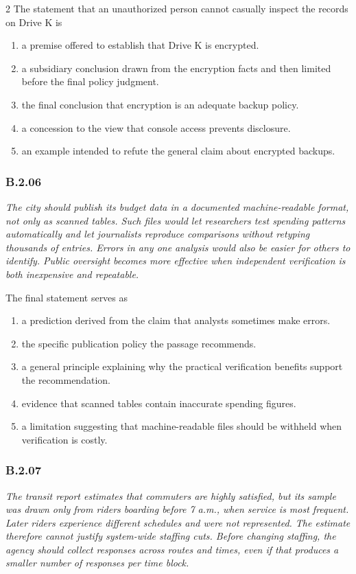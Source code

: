 \documentclass[10pt]{extarticle}
\newcommand{\choice}[1]{\item #1}
\newcommand{\bankitem}[1]{\subsubsection*{#1}}
\begin{document}
\begin{multicols}{2}
The statement that an unauthorized person cannot casually inspect the records on Drive K is
\begin{enumerate}[label=(\alph*)]
  \choice{a premise offered to establish that Drive K is encrypted.}
  \choice{a subsidiary conclusion drawn from the encryption facts and then limited before the final policy judgment.}
  \choice{the final conclusion that encryption is an adequate backup policy.}
  \choice{a concession to the view that console access prevents disclosure.}
  \choice{an example intended to refute the general claim about encrypted backups.}
\end{enumerate}
\bankitem{B.2.06}
\emph{The city should publish its budget data in a documented machine-readable format, not only as scanned tables. Such files would let researchers test spending patterns automatically and let journalists reproduce comparisons without retyping thousands of entries. Errors in any one analysis would also be easier for others to identify. Public oversight becomes more effective when independent verification is both inexpensive and repeatable.}

The final statement serves as
\begin{enumerate}[label=(\alph*)]
  \choice{a prediction derived from the claim that analysts sometimes make errors.}
  \choice{the specific publication policy the passage recommends.}
  \choice{a general principle explaining why the practical verification benefits support the recommendation.}
  \choice{evidence that scanned tables contain inaccurate spending figures.}
  \choice{a limitation suggesting that machine-readable files should be withheld when verification is costly.}
\end{enumerate}
\bankitem{B.2.07}
\emph{The transit report estimates that commuters are highly satisfied, but its sample was drawn only from riders boarding before 7 a.m., when service is most frequent. Later riders experience different schedules and were not represented. The estimate therefore cannot justify system-wide staffing cuts. Before changing staffing, the agency should collect responses across routes and times, even if that produces a smaller number of responses per time block.}


\end{multicols}
\end{document}
